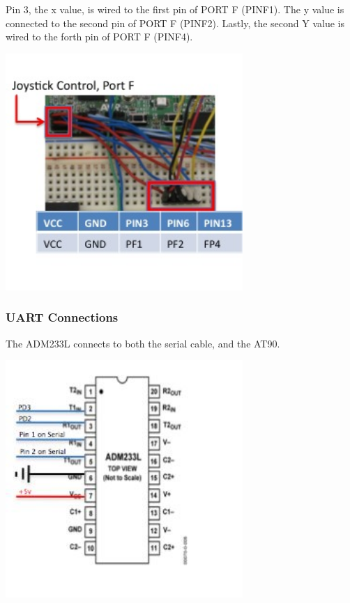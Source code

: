 Pin 3, the x value, is wired to the first pin of PORT F (PINF1). The y value is connected to the second pin of PORT F (PINF2). Lastly, the second Y value is wired to the forth pin of PORT F (PINF4).

  \begin{minipage}{6.5in}
    \includegraphics[width=90mm]{imageSources/joystickConnect.png}
  \centering
  \label{joystickConnect}
\end{minipage}

\subsubsection{UART Connections}
The ADM233L connects to both the serial cable, and the AT90. 


  \begin{minipage}{6.5in}
    \includegraphics[width=90mm]{imageSources/uartConnect1.png}
  \centering
  \label{uartConnect1}
\end{minipage}



